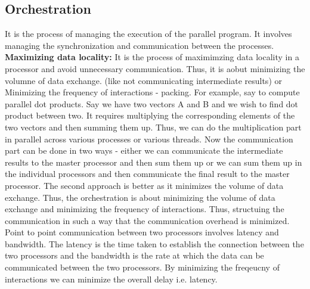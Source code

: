 \documentclass[12pt]{article}
\begin{document}
\subsection{Orchestration}
It is the process of managing the execution of the parallel program. It involves managing the synchronization and communication between the processes.
\textbf{Maximizing data locality: }It is the process of maximimzing data locality in a processor and avoid unnecessary communication. Thus, it is aobut minimizing the volumne of data exchange.
(like not communicating intermediate results) or Minimizing the frequency of interactions - packing.
For example, say to compute parallel dot products. Say we have two vectors A and B and we wish to find dot product between two. It requires 
multiplying the corresponding elements of the two vectors and then summing them up. Thus, we can do the multiplication part in parallel across various processes or various threads.
Now the communication part can be done in two ways - either we can communicate the intermediate results to the master processor and then sum them up or we can sum them up in the individual processors and then communicate the final result to the master processor.
The second approach is better as it minimizes the volume of data exchange. Thus, the orchestration is about minimizing the volume of data exchange and minimizing the frequency of interactions. Thus, structuing the communication in such a way that the communication overhead is minimized.
Point to point communication between two processors involves latency and bandwidth. The latency is the time taken to establish the connection between the two processors and the bandwidth is the rate at which the data can be communicated between the two processors. By minimizing the freqeucny of interactions we can minimize the overall delay i.e. latency.








\newpage
\end{document}
